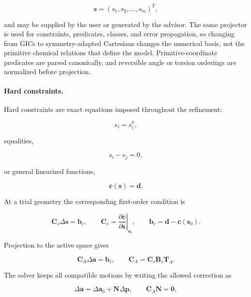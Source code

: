 \documentclass[aip,jcp,reprint,longbibliography,floatfix]{revtex4-2}
\begin{document}
\begin{equation}
\mathbf{s} = (s_1,s_2,\ldots,s_m)^T ,
\end{equation}

and may be supplied by the user or generated by the advisor. The same
projector is used for constraints, predicates, classes, and error propagation,
so changing from GICs to symmetry-adapted Cartesians changes the numerical
basis, not the primitive chemical relations that define the model.
Primitive-coordinate predicates are parsed canonically, and reversible
angle or torsion orderings are normalized before projection.

\paragraph{Hard constraints.}

Hard constraints are exact equations imposed throughout the refinement:

\begin{equation}
s_i=s_i^{0},
\end{equation}

equalities,

\begin{equation}
s_i-s_j=0,
\end{equation}

or general linearized functions,

\begin{equation}
\mathbf{c}(\mathbf{s})=\mathbf{d}.
\end{equation}

At a trial geometry the corresponding first-order condition is

\begin{equation}
\mathbf{C}_s
\Delta\mathbf{s}
=
\mathbf{b}_c,
\qquad
\mathbf{C}_s =
\left.
\frac{\partial\mathbf{c}}
{\partial\mathbf{s}}
\right|_{\mathbf{s}_0},
\qquad
\mathbf{b}_c=\mathbf{d}-\mathbf{c}(\mathbf{s}_0).
\end{equation}

Projection to the active space gives

\begin{equation}
\mathbf{C}_{A}
\Delta\mathbf{a}
=
\mathbf{b}_c,
\qquad
\mathbf{C}_{A}
=
\mathbf{C}_s
\mathbf{B}_s
\mathbf{T}_{A}.
\end{equation}

The solver keeps all compatible motions by writing the allowed correction as

\begin{equation}
\Delta\mathbf{a}
=
\Delta\mathbf{a}_0
+
\mathbf{N}\Delta\mathbf{p},
\qquad
\mathbf{C}_{A}\mathbf{N}=\mathbf{0},
\end{equation}
\end{document}

